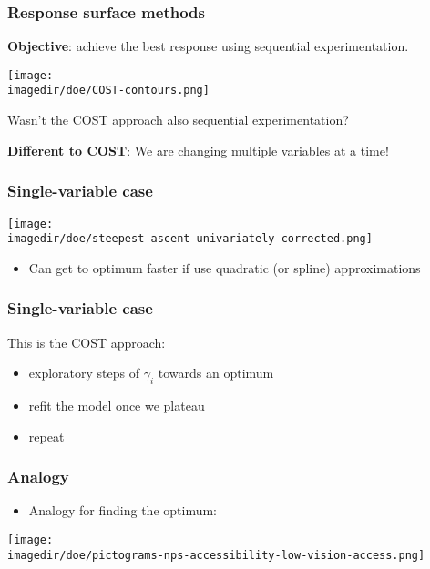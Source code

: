 \begin{frame}\frametitle{Response surface methods}

	\textbf{Objective}: achieve the best response using sequential experimentation.
	\begin{center}
		\texttt{[image: \\imagedir/doe/COST-contours.png]}
	\end{center}
	Wasn't the COST approach also sequential experimentation?

	\textbf{Different to COST}: We are changing multiple variables at a time!
\end{frame}

\begin{frame}\frametitle{Single-variable case}
	\begin{center}
		\texttt{[image: \\imagedir/doe/steepest-ascent-univariately-corrected.png]}
	\end{center}
	\begin{itemize}
		\item	Can get to optimum faster if use quadratic (or spline) approximations
	\end{itemize}
\end{frame}

\begin{frame}\frametitle{Single-variable case}

	This is the COST approach:
	\begin{itemize}
		\item	exploratory steps of $\gamma_i$ towards an optimum
		\item	refit the model once we plateau
		\item	repeat
	\end{itemize}
\end{frame}

\begin{frame}\frametitle{Analogy}
	\begin{itemize}
		\item	Analogy for finding the optimum:
	\end{itemize}
	\begin{center}
		\texttt{[image: \\imagedir/doe/pictograms-nps-accessibility-low-vision-access.png]} %
	\end{center}
\end{frame}

